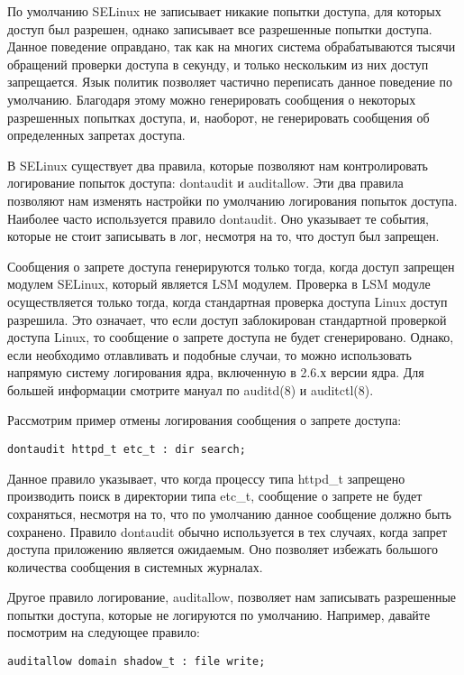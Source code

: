 \documentclass{./../class/UIR}
\begin{document}
По умолчанию SELinux не записывает никакие попытки доступа, для которых доступ
был разрешен, однако записывает все разрешенные попытки доступа. Данное
поведение оправдано, так как на многих система обрабатываются тысячи обращений
проверки доступа в секунду, и только нескольким из них доступ запрещается. Язык
политик позволяет частично переписать данное поведение по умолчанию. Благодаря
этому можно генерировать сообщения о некоторых разрешенных попытках доступа, и,
наоборот, не генерировать сообщения об определенных запретах доступа.

В SELinux существует два правила, которые позволяют нам контролировать
логирование попыток доступа: dontaudit и auditallow. Эти два правила позволяют
нам изменять настройки по умолчанию логирования попыток доступа. Наиболее часто
используется правило dontaudit. Оно указывает те события, которые не стоит
записывать в лог, несмотря на то, что доступ был запрещен.

Сообщения о запрете доступа генерируются только тогда, когда доступ запрещен
модулем SELinux, который является LSM модулем. Проверка в LSM модуле
осуществляется только тогда, когда стандартная проверка доступа Linux доступ
разрешила. Это означает, что если доступ заблокирован стандартной проверкой
доступа Linux, то сообщение о запрете доступа не будет сгенерировано. Однако,
если необходимо отлавливать и подобные случаи, то можно использовать напрямую
систему логирования ядра, включенную в 2.6.х версии ядра. Для большей информации
смотрите мануал по auditd(8) и auditctl(8).

Рассмотрим пример отмены логирования сообщения о запрете доступа:

\begin{verbatim}
dontaudit httpd_t etc_t : dir search;
\end{verbatim}

Данное правило указывает, что когда процессу типа httpd\_t запрещено производить
поиск в директории типа etc\_t, сообщение о запрете не будет сохраняться,
несмотря на то, что по умолчанию данное сообщение должно быть сохранено. Правило
dontaudit обычно используется в тех случаях, когда запрет доступа приложению
является ожидаемым. Оно позволяет избежать большого количества сообщения в
системных журналах.

Другое правило логирование, auditallow, позволяет нам записывать разрешенные
попытки доступа, которые не логируются по умолчанию. Например, давайте посмотрим
на следующее правило:

\begin{verbatim}
auditallow domain shadow_t : file write;
\end{verbatim}
\end{document}
